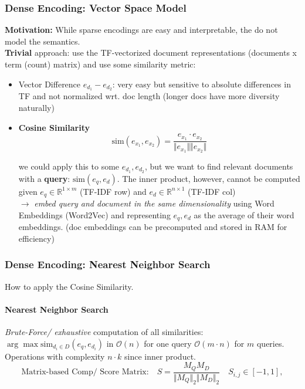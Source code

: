 \documentclass{article}
\begin{document}
\subsubsection{Dense Encoding: Vector Space Model}
\textbf{Motivation:} While sparse encodings are easy and interpretable, the do not model the semantics.\\

\textbf{Trivial} approach: use the TF-vectorized document representations (documents x term (count) matrix) and use some similarity metric: 
\begin{itemize}
    \item Vector Difference $e_{d_1}- e_{d_2}$: very easy but sensitive to absolute differences in TF and not normalized wrt. doc length (longer docs have more diversity naturally)
    \item \textbf{Cosine Similarity}
    $$
    \text{sim}(e_{x_1}, e_{x_2})= \frac{e_{x_1}\cdot e_{x_2}}{\Vert e_{x_1} \Vert \Vert e_{x_2} \Vert}
    $$

    we could apply this to some $e_{d_1}, e_{d_2}$, but we want to find relevant documents with a \textbf{query}: $\text{sim}(e_{q}, e_{d})$. The inner product, however, cannot be computed given $e_q \in \mathbb{R}^{1 \times m}$ (TF-IDF row) and $e_d \in \mathbb{R}^{n \times 1}$ (TF-IDF col)\\

    $\rightarrow$ \textit{embed query and document in the same dimensionality} using Word Embeddings (Word2Vec) and representing $e_q, e_d$ as the average of their word embeddings. (doc embeddings can be precomputed and stored in RAM for efficiency)
\end{itemize}

\subsubsection{Dense Encoding: Nearest Neighbor Search}
How to apply the Cosine Similarity.
\paragraph{Nearest Neighbor Search}
\textit{Brute-Force/ exhaustive} computation of all similarities: $\arg \max \text{sim}_{d_i \in D}(e_q,e_{d_i})$ in $\mathcal{O}(n)$ for one query $\mathcal{O}(m\cdot n)$ for $m$ queries. Operations with complexity $n \cdot k$ since inner product.
$$
\text{Matrix-based Comp/ Score Matrix:} \quad S=\frac{M_QM_D}{\Vert M_Q\Vert_2 \Vert M_D \Vert_2} \quad S_{i,j}\in [-1,1],
$$
\end{document}
